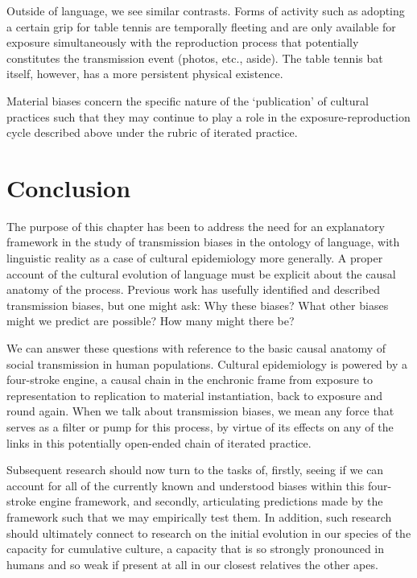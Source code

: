 Outside of language, we see similar contrasts. Forms of activity such as 
adopting a certain grip for table tennis are temporally fleeting and are 
only available for exposure simultaneously with the reproduction process 
that potentially constitutes the transmission event (photos, etc., 
aside). The table tennis bat itself, however, has a more persistent 
physical existence. 



Material biases concern the specific nature of the \textquoteleft publication' of 
cultural practices such that they may continue to play a role in the 
exposure-reproduction cycle described above under the rubric of iterated 
practice.



\section{Conclusion}


The purpose of this chapter has been to address the need for an 
explanatory framework in the study of transmission biases in the ontology of language, with linguistic reality as a case of cultural 
epidemiology more generally. A proper account 
of the cultural evolution of language must be explicit about the causal 
anatomy of the process. Previous work has usefully identified and 
described transmission biases, but one might ask: Why these biases? What 
other biases might we predict are possible? How many might there be? 



We can answer these questions with reference to the basic 
causal anatomy of social transmission in human populations. Cultural 
epidemiology is powered by a four-stroke engine, a causal chain in the enchronic frame from 
exposure to representation to replication to material instantiation, 
back to exposure and round again. When we talk about transmission 
biases, we mean any force that serves as a filter or pump for this 
process, by virtue of its effects on any of the links in this 
potentially open-ended chain of iterated practice. 



Subsequent research should now turn to the tasks of, firstly, seeing if 
we can account for all of the currently known and understood biases 
within this four-stroke engine framework, and secondly, articulating 
predictions made by the framework such that we may empirically test 
them. In addition, such research should ultimately connect to research 
on the initial evolution in our species of the capacity for cumulative 
culture, a capacity that is so strongly pronounced in humans and so weak 
if present at all in our closest relatives the other apes. 



